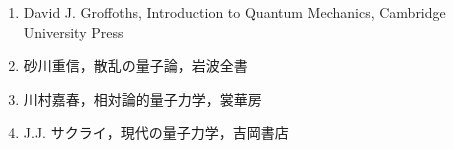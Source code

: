 \documentclass{report}
\begin{document}
\begin{enumerate}
  \item David J. Groffoths, Introduction to Quantum Mechanics, Cambridge University Press
  \item 砂川重信，散乱の量子論，岩波全書
  \item 川村嘉春，相対論的量子力学，裳華房
  \item J.J. サクライ，現代の量子力学，吉岡書店
\end{enumerate}
\end{document}
